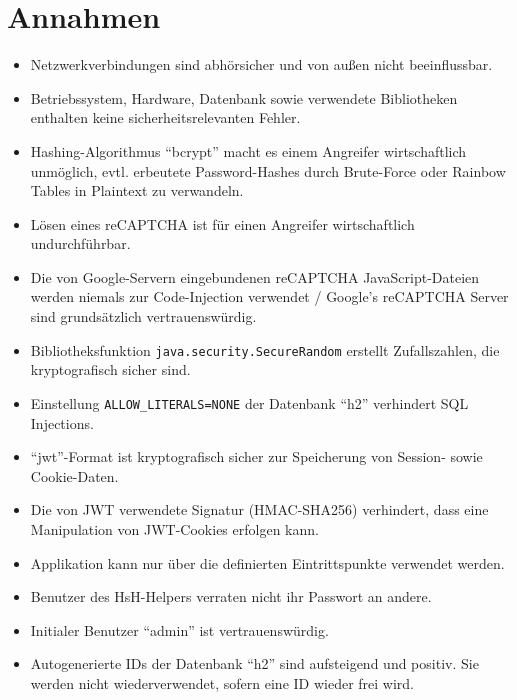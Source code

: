 \documentclass[fontsize=12pt,DIV=14,BCOR=10mm,a4paper,parskip=half-,headsepline,headinclude,english,ngerman,bibliography=totocnumbered]{scrreprt}
\begin{document}
\vspace*{-3cm}

\addto{\captionsgerman}{\renewcommand{\refname}{Literaturverzeichnis}}

\clearpage

\tableofcontents  %

\clearpage

\chapter{Annahmen}

\begin{itemize}
  \item Netzwerkverbindungen sind abhörsicher und von außen nicht beeinflussbar.
  \item Betriebssystem, Hardware, Datenbank sowie verwendete Bibliotheken enthalten keine sicherheitsrelevanten Fehler.
  \item Hashing-Algorithmus \enquote{bcrypt} macht es einem Angreifer wirtschaftlich unmöglich, evtl. erbeutete Password-Hashes durch Brute-Force oder Rainbow Tables in Plaintext zu verwandeln.
  \item Lösen eines reCAPTCHA ist für einen Angreifer wirtschaftlich undurchführbar.
  \item Die von Google-Servern eingebundenen reCAPTCHA JavaScript-Dateien werden niemals zur Code-Injection verwendet / Google's reCAPTCHA Server sind grund\-sätzlich vertrauenswürdig.
  \item Bibliotheksfunktion \texttt{java.security.SecureRandom} \autocite{JavaDocs.SecureRandom} erstellt Zufallszahlen, die kryptografisch sicher sind.
  \item Einstellung \texttt{ALLOW\_LITERALS=NONE} der Datenbank \enquote{h2} verhindert SQL Injections.
  \item \enquote{\gls{jwt}}-Format ist kryptografisch sicher zur Speicherung von Session- sowie Cookie-Daten.
  \item Die von JWT verwendete Signatur (HMAC-SHA256) verhindert, dass eine Manipulation von JWT-Cookies erfolgen kann.
  \item Applikation kann nur über die definierten Eintrittspunkte verwendet werden.
  \item Benutzer des HsH-Helpers verraten nicht ihr Passwort an andere.
  \item Initialer Benutzer \enquote{admin} ist vertrauenswürdig.
  \item Autogenerierte IDs der Datenbank \enquote{h2} sind aufsteigend und positiv. Sie werden nicht wiederverwendet, sofern eine ID wieder frei wird.

\end{itemize}
\end{document}
